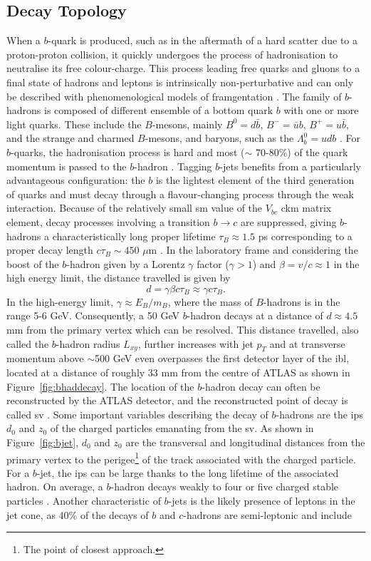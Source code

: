 \subsection{Decay Topology}
When a $b$-quark is produced, such as in the aftermath of a hard scatter due to a proton-proton collision, it quickly undergoes the process of hadronisation to neutralise its free colour-charge. This process leading free quarks and gluons to a final state of hadrons and leptons is intrinsically non-perturbative and can only be described with phenomenological models of framgentation \cite{Webber:419784}. The family of $b$-hadrons is composed of different ensemble of a bottom quark $b$ with one or more light quarks. These include the $B$-mesons, mainly $B^0=d\bar{b}$, $B^-=\bar{u}b$, $B^+=u\bar{b}$, and the strange and charmed $B$-mesons, and baryons, such as the $\Lambda_b^0=udb$ \cite{ATL-PHYS-PUB-2014-008}. For $b$-quarks, the hadronisation process is hard and most ($\sim$ 70-80\%) of the quark momentum is passed to the $b$-hadron \cite{Webber:419784}. Tagging $b$-jets benefits from a particularly advantageous configuration: the $b$ is the lightest element of the third generation of quarks and must decay through a flavour-changing process through the weak interaction. Because of the relatively small \gls{sm} value of the $V_{bc}$ \gls{ckm} matrix element, decay processes involving a transition $b \rightarrow c$ are suppressed, giving $b$-hadrons a characteristically long proper lifetime $\tau_B \approx 1.5$ ps corresponding to a proper decay length $c\tau_{B} \sim 450$ $\mu$m \cite{Tanabashi:2018oca}. In the laboratory frame and considering the boost of the $b$-hadron given by a Lorentz $\gamma$ factor ($\gamma > 1$) and $\beta = v/c \approx 1$ in the high energy limit, the distance travelled is given by \[d = \gamma \beta c \tau_B \approx \gamma c \tau_B.\] In the high-energy limit, $\gamma \approx E_B / m_B$, where the mass of $B$-hadrons is in the range 5-6 GeV. Consequently, a 50 GeV $b$-hadron decays at a distance of $d \approx 4.5$ mm from the primary vertex which can be resolved. This distance travelled, also called the $b$-hadron radius $L_{xy}$, further increases with jet $p_T$ and at transverse momentum above $\sim$500 GeV even overpasses the first detector layer of the \gls{ibl}, located at a distance of roughly 33 mm from the centre of ATLAS as shown in Figure~\ref{fig:bhaddecay}. The location of the $b$-hadron decay can often be reconstructed by the ATLAS detector, and the reconstructed point of decay is called \gls{sv} \cite{Aad:2019aic}. Some important variables describing the decay of $b$-hadrons are the \glspl{ip} $d_0$ and $z_0$ of the charged particles emanating from the \gls{sv}. As shown in Figure~\ref{fig:bjet}, $d_0$ and $z_0$ are the transversal and longitudinal distances from the primary vertex to the perigee\footnote{The point of closest approach.} of the track associated with the charged particle. For a $b$-jet, the \glspl{ip} can be large thanks to the long lifetime of the associated hadron. On average, a $b$-hadron decays weakly to four or five charged stable particles \cite{ATL-PHYS-PUB-2014-008}. Another characteristic of $b$-jets is the likely presence of leptons in the jet cone, as 40\% of the decays of $b$ and $c$-hadrons are semi-leptonic and include 